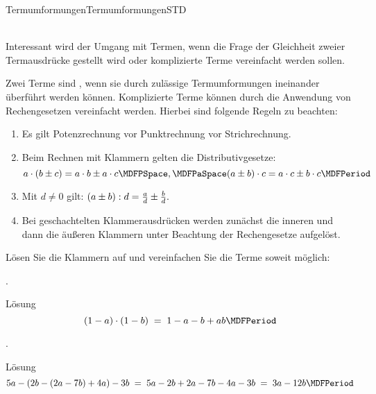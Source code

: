 \begin{MXContent}{Termumformungen}{Termumformungen}{STD}

\ \\
Interessant wird der Umgang mit Termen, wenn die Frage der Gleichheit zweier Termausdrücke gestellt wird oder komplizierte Terme vereinfacht werden sollen. 

\begin{MInfo}
Zwei Terme sind , wenn sie durch zulässige Termumformungen ineinander überführt werden können. Komplizierte Terme können durch die Anwendung von Rechengesetzen vereinfacht werden. Hierbei sind folgende Regeln zu beachten:
\begin{enumerate}
\item Es gilt Potenzrechnung vor Punktrechnung vor Strichrechnung.
\item Beim Rechnen mit Klammern gelten die Distributivgesetze:
$$a\cdot(b\pm c) = a\cdot b\pm a\cdot c \MDFPSpace, \MDFPaSpace (a\pm b)\cdot c = a\cdot c \pm b\cdot c \MDFPeriod$$
\item Mit $d\neq 0$ gilt: $\displaystyle (a\pm b):d = \tfrac{a}{d}\pm \tfrac{b}{d}.$
\item Bei geschachtelten Klammerausdrücken werden zunächst die inneren und dann die äußeren Klammern unter Beachtung der Rechengesetze aufgelöst.
\end{enumerate}
\end{MInfo}

\begin{MExercise}
Lösen Sie die Klammern auf und vereinfachen Sie die Terme soweit möglich:
\begin{MExerciseItems}
\item{. \begin{MHint}{Lösung}$$(1-a)\cdot(1-b)\;=\; 1-a-b+a b \MDFPeriod $$\end{MHint}}
\item{. \begin{MHint}{Lösung}$$5a-(2b-(2a-7b)+4a)-3b \; = \; 5a-2b+2a-7b-4a-3b \;=\; 3a-12b \MDFPeriod  $$\end{MHint}}
\end{MExerciseItems}
\end{MExercise}


\end{MXContent}
